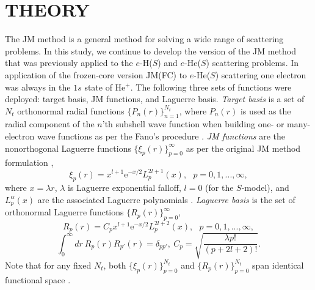 \documentclass[aip
, pra
, showpacs
, aps
, twocolumn
, groupedaddress
, floatfix
]{revtex4}
\newcommand{\beq}{\begin{equation}}
\newcommand{\eeq}{\end{equation}}
\begin{document}
\begin{table}[htb]
\begin{ruledtabular}
\begin{tabular}{rlll}




\end{tabular}
\end{ruledtabular}
\end{table}



\section{THEORY}

The JM method \cite{JMatrix2008,HY74p1201,BR76p1491} is a general method for solving a wide range of scattering problems.
In this study, we continue to develop the version of the JM method that
was previously applied to the $e$-H($S$) \cite{KB10p022708}  and $e$-He($S$) \cite{KFB11} scattering problems.
In application of the frozen-core version JM(FC)
to $e$-He($S$) \cite{KFB11} scattering one electron was always in the $1s$ state of He$^+$.
The following three sets of functions were deployed: target basis, JM functions, and Laguerre basis.
{\em Target basis} is a set of $N_t$ orthonormal radial functions $\{P_n(r)\}_{n=1}^{N_t}$,
where $P_n(r)$ is used as the radial component of the $n$'th subshell wave function
when building one- or many-electron wave functions as per the Fano's procedure \cite{Fano65, KFB11}.
{\em JM functions} are the nonorthogonal Laguerre functions $\{\xi_p(r)\}_{p=0}^\infty$ as per the original JM method
formulation \cite{HY74p1201,BR76p1491},
\beq
\xi_p(r) = x^{l+1} \mbox{e}^{-x /2}
L_p^{2l+1}(x), \ \ \ p = 0, 1, ..., \infty,
\eeq
where $x=\lambda r$, $\lambda$ is Laguerre exponential falloff,
$l = 0$ (for the $S$-model), and $L_p^{\alpha}(x)$ are the associated Laguerre polynomials \cite{abramowitz}.
{\em Laguerre basis} is the set of orthonormal Laguerre functions $\{R_p(r)\}_{p=0}^\infty$,
\beq
R_p(r) = C_p x^{l+1} \mbox{e}^{-x /2}
L_p^{2l+2}(x), \ \ \ p = 0, 1, ..., \infty,
\eeq
\beq
\int_0^\infty dr \ R_p(r) R_{p'}(r) = \delta_{pp'}, \ C_p= \sqrt{\frac{\lambda p!}{ (p+2l+2)!}}.
\eeq
Note that for any fixed $N_t$, both $\{\xi_p(r)\}_{p=0}^{N_t}$ and $\{R_p(r)\}_{p=0}^{N_t}$
span identical functional space \cite{KB10p022708}.
\end{document}
